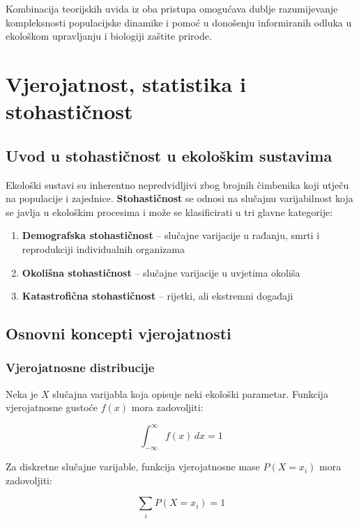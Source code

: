 \documentclass[11pt,oneside]{book}
\begin{document}
Kombinacija teorijskih uvida iz oba pristupa omogućava dublje razumijevanje kompleksnosti populacijske dinamike i pomoć u donošenju informiranih odluka u ekološkom upravljanju i biologiji zaštite prirode.

\section{Vjerojatnost, statistika i stohastičnost}

\subsection{Uvod u stohastičnost u ekološkim sustavima}

Ekološki sustavi su inherentno nepredvidljivi zbog brojnih čimbenika koji utječu na populacije i zajednice. \textbf{Stohastičnost} se odnosi na slučajnu varijabilnost koja se javlja u ekološkim procesima i može se klasificirati u tri glavne kategorije:

\begin{enumerate}
	\item \textbf{Demografska stohastičnost} -- slučajne varijacije u rađanju, smrti i reprodukciji individualnih organizama
	\item \textbf{Okolišna stohastičnost} -- slučajne varijacije u uvjetima okoliša
	\item \textbf{Katastrofična stohastičnost} -- rijetki, ali ekstremni događaji
\end{enumerate}

\subsection{Osnovni koncepti vjerojatnosti}

\subsubsection{Vjerojatnosne distribucije}

Neka je $X$ slučajna varijabla koja opisuje neki ekološki parametar. Funkcija vjerojatnosne gustoće $f(x)$ mora zadovoljiti:

\begin{equation}
	\int_{-\infty}^{\infty} f(x) \, dx = 1
\end{equation}

Za diskretne slučajne varijable, funkcija vjerojatnosne mase $P(X = x_i)$ mora zadovoljiti:

\begin{equation}
	\sum_{i} P(X = x_i) = 1
\end{equation}
\end{document}
